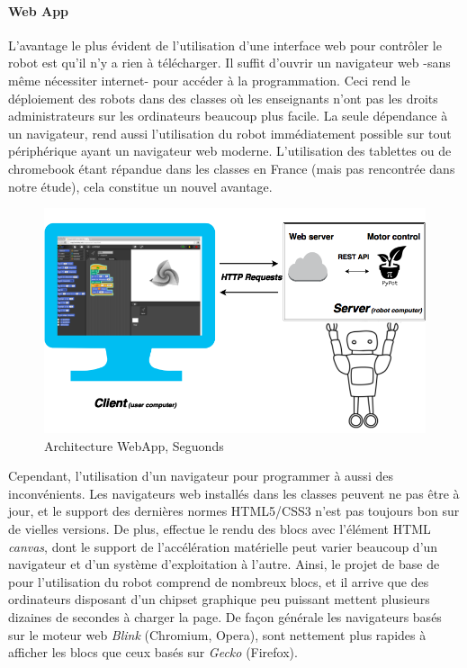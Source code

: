         \paragraph{Web App}
            L'avantage le plus évident de l'utilisation d'une interface web pour contrôler le robot est qu'il n'y a rien à télécharger. Il suffit d'ouvrir un navigateur web -sans même nécessiter internet- pour accéder à la programmation. Ceci rend le déploiement des robots dans des classes où les enseignants n'ont pas les droits administrateurs sur les ordinateurs beaucoup plus facile.
            La seule dépendance à un navigateur, rend aussi l'utilisation du robot immédiatement possible sur tout périphérique ayant un navigateur web moderne. L'utilisation des tablettes ou de chromebook étant répandue dans les classes en France (mais pas rencontrée dans notre étude), cela constitue un nouvel avantage.
            \begin{figure}[!h]
                \centering
                \includegraphics[width=0.9\linewidth]{Figures/Segonds-web_app}
                \caption{Architecture WebApp, Seguonds \cite{RI}}\label{fig:WebApp}
            \end{figure}\par%
            Cependant, l'utilisation d'un navigateur pour programmer à aussi des inconvénients. Les navigateurs web installés dans les classes peuvent ne pas être à jour, et le support des dernières normes HTML5/CSS3 n'est pas toujours bon sur de vielles versions. De plus,  effectue le rendu des blocs avec l'élément HTML \textit{canvas}, dont le support de l'accélération matérielle peut varier beaucoup d'un navigateur et d'un système d'exploitation à l'autre. Ainsi, le projet de base de  pour l'utilisation du robot comprend de nombreux blocs, et il arrive que des ordinateurs disposant d'un chipset graphique peu puissant mettent plusieurs dizaines de secondes à charger la page. De façon générale les navigateurs basés sur le moteur web \textit{Blink} (Chromium, Opera), sont nettement plus rapides à afficher les blocs  que ceux basés sur \textit{Gecko} (Firefox).
